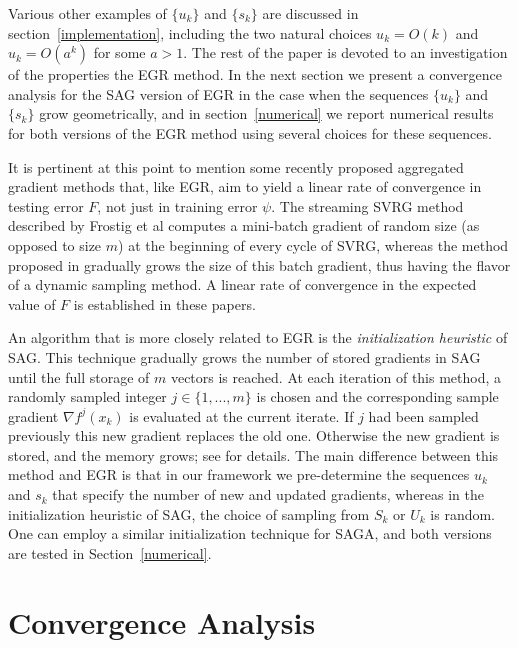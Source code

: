 \documentclass[11pt]{article}
\begin{document}
Various other examples of $\{ u_k \}$ and $\{ s_k \}$ are discussed in section~\ref{implementation}, including the two natural choices $u_k = O(k)$ and $u_k = O(a^k)$ for some $a>1$. The rest of the paper is devoted to an investigation of the properties the EGR method. In the next section we present a convergence analysis for the SAG version of EGR in the case when the sequences  $\{ u_k \}$ and $\{ s_k \}$ grow geometrically, and in section~\ref{numerical} we report numerical results for both versions of the EGR method using several choices for these sequences.

{\color{blue} It is pertinent at this point to mention some recently proposed aggregated gradient methods that, like EGR, aim to yield a linear rate of convergence in testing error $F$, not just in training error $\psi$. The streaming SVRG method described by Frostig et al \cite{frostig2014competing} computes a mini-batch gradient of random size (as opposed to size $m$) at the beginning of every cycle of SVRG, whereas  the method proposed in   \cite{babanezhad2015stop} gradually grows the size of this batch gradient, thus having the flavor of a dynamic sampling method. A linear rate of convergence in the expected value of $F$ is established in these papers. 



An algorithm that is more closely related to EGR is the  \emph{initialization heuristic} of SAG. This technique gradually grows the  number of stored gradients in SAG until the full storage of $m$ vectors is reached. At each iteration of this method, a randomly sampled integer $j \in \{1, ...,m\}$  is chosen and the corresponding sample gradient $\nabla f^j(x_k)$ is evaluated at the current iterate. If $j$ had been sampled previously this new gradient replaces the old one.  Otherwise the new gradient is stored, and the memory grows; see \cite{roux2012stochastic} for details. The main difference between this method and EGR is that in our framework we pre-determine the sequences $u_k$ and $s_k$ that specify the number of new and updated gradients, whereas in the {initialization heuristic} of SAG, the choice of sampling from $S_k$ or $U_k$ is random. One can employ a similar initialization technique for SAGA, and both versions are tested in Section~\ref{numerical}.
}





\section{Convergence Analysis}  \label{analysis}
\setcounter{equation}{0}
\end{document}
